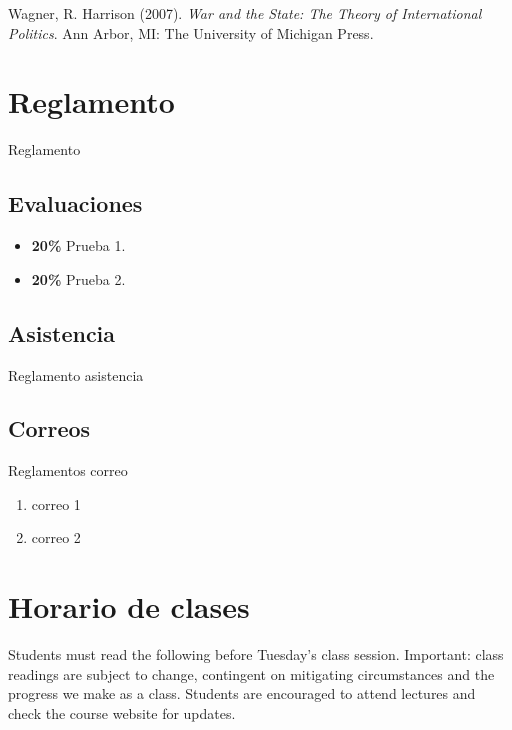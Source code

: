 \documentclass[11pt,]{article}
\providecommand{\tightlist}{%
  \setlength{\itemsep}{0pt}\setlength{\parskip}{0pt}}
\begin{document}
Wagner, R. Harrison (2007).
\emph{War and the State: The Theory of International Politics}. Ann
Arbor, MI: The University of Michigan Press.

\hypertarget{reglamento}{%
\section{Reglamento}\label{reglamento}}

Reglamento

\hypertarget{evaluaciones}{%
\subsection{Evaluaciones}\label{evaluaciones}}

\begin{itemize}
\item
  \textbf{20\%} Prueba 1.
\item
  \textbf{20\%} Prueba 2.
\end{itemize}

\hypertarget{asistencia}{%
\subsection{Asistencia}\label{asistencia}}

Reglamento asistencia

\hypertarget{correos}{%
\subsection{Correos}\label{correos}}

Reglamentos correo

\begin{enumerate}
\def\labelenumi{\arabic{enumi}.}
\tightlist
\item
  correo 1
\item
  correo 2
\end{enumerate}

\newpage

\hypertarget{horario-de-clases}{%
\section{Horario de clases}\label{horario-de-clases}}

Students must read the following before Tuesday's class session.
Important: class readings are subject to change, contingent on
mitigating circumstances and the progress we make as a class. Students
are encouraged to attend lectures and check the course website for
updates.
\end{document}
